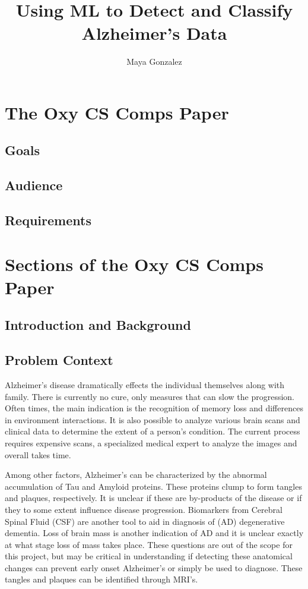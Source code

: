 \documentclass[10pt,twocolumn]{article}
\title{Using ML to Detect and Classify Alzheimer's Data}
\author{Maya Gonzalez}
\affiliation{Occidental College}
\begin{document}
\maketitle

\begin{abstract}
\end{abstract}
\section{The Oxy CS Comps Paper}

\subsection{Goals}

\subsection{Audience}

\subsection{Requirements}

\section{Sections of the Oxy CS Comps Paper}

\subsection{Introduction and Background}

\subsection{Problem Context}
Alzheimer's disease dramatically effects the individual themselves along with family. There is currently no cure, only measures that can slow the progression. Often times, the main indication is the recognition of memory loss and differences in environment interactions. It is also possible to analyze various brain scans and clinical data to determine the extent of a person's  condition. The current process requires expensive scans, a specialized medical expert to analyze the images and overall takes time. 

Among other factors, Alzheimer's can be characterized by the abnormal accumulation of Tau and Amyloid proteins. These proteins clump to form tangles and plaques, respectively. It is unclear if these are by-products of the disease or if they to some extent influence disease progression. Biomarkers from Cerebral Spinal Fluid (CSF) are another tool to aid in diagnosis of (AD) degenerative dementia. Loss of brain mass is another indication of AD and it is unclear exactly at what stage loss of mass takes place. These questions are out of the scope for this project, but may be critical in understanding if detecting these anatomical changes can prevent early onset Alzheimer's or simply be used to diagnose. These tangles and plaques can be identified through MRI's. 
\end{document}
